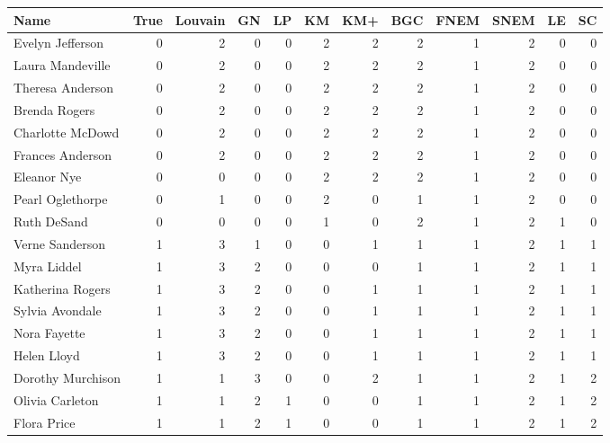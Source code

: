 \begin{tabular}{lrrrrrrrrrrr}
\toprule
Name & True & Louvain & GN & LP & KM & KM+ & BGC & FNEM & SNEM & LE & SC \\
\midrule
Evelyn Jefferson & 0 & 2 & 0 & 0 & 2 & 2 & 2 & 1 & 2 & 0 & 0 \\
Laura Mandeville & 0 & 2 & 0 & 0 & 2 & 2 & 2 & 1 & 2 & 0 & 0 \\
Theresa Anderson & 0 & 2 & 0 & 0 & 2 & 2 & 2 & 1 & 2 & 0 & 0 \\
Brenda Rogers & 0 & 2 & 0 & 0 & 2 & 2 & 2 & 1 & 2 & 0 & 0 \\
Charlotte McDowd & 0 & 2 & 0 & 0 & 2 & 2 & 2 & 1 & 2 & 0 & 0 \\
Frances Anderson & 0 & 2 & 0 & 0 & 2 & 2 & 2 & 1 & 2 & 0 & 0 \\
Eleanor Nye & 0 & 0 & 0 & 0 & 2 & 2 & 2 & 1 & 2 & 0 & 0 \\
Pearl Oglethorpe & 0 & 1 & 0 & 0 & 2 & 0 & 1 & 1 & 2 & 0 & 0 \\
Ruth DeSand & 0 & 0 & 0 & 0 & 1 & 0 & 2 & 1 & 2 & 1 & 0 \\
Verne Sanderson & 1 & 3 & 1 & 0 & 0 & 1 & 1 & 1 & 2 & 1 & 1 \\
Myra Liddel & 1 & 3 & 2 & 0 & 0 & 0 & 1 & 1 & 2 & 1 & 1 \\
Katherina Rogers & 1 & 3 & 2 & 0 & 0 & 1 & 1 & 1 & 2 & 1 & 1 \\
Sylvia Avondale & 1 & 3 & 2 & 0 & 0 & 1 & 1 & 1 & 2 & 1 & 1 \\
Nora Fayette & 1 & 3 & 2 & 0 & 0 & 1 & 1 & 1 & 2 & 1 & 1 \\
Helen Lloyd & 1 & 3 & 2 & 0 & 0 & 1 & 1 & 1 & 2 & 1 & 1 \\
Dorothy Murchison & 1 & 1 & 3 & 0 & 0 & 2 & 1 & 1 & 2 & 1 & 2 \\
Olivia Carleton & 1 & 1 & 2 & 1 & 0 & 0 & 1 & 1 & 2 & 1 & 2 \\
Flora Price & 1 & 1 & 2 & 1 & 0 & 0 & 1 & 1 & 2 & 1 & 2 \\
\bottomrule
\end{tabular}

